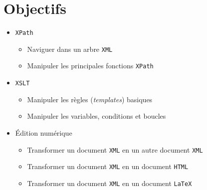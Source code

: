 \documentclass[a4paper]{article}
\begin{document}
\section*{Objectifs}
      \begin{itemize}
          \item \texttt{XPath}
          \begin{itemize}
              \item Naviguer dans un arbre \texttt{XML}
              \item Manipuler les principales fonctions \texttt{XPath}
          \end{itemize}
          \item \texttt{XSLT}
          \begin{itemize}
              \item Manipuler les règles (\textit{templates}) basiques
              \item Manipuler les variables, conditions et boucles
          \end{itemize}
          \item Édition numérique
          \begin{itemize}
              \item Transformer un document \texttt{XML} en un autre document \texttt{XML}
              \item Transformer un document \texttt{XML} en un document \texttt{HTML}
              \item Transformer un document \texttt{XML} en un document \texttt{LaTeX}
          \end{itemize}
      \end{itemize}
\end{document}
